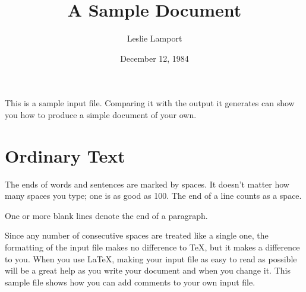 %
 
 
\title{A Sample Document}  %
\author{Leslie Lamport}    %
\date{December 12, 1984}   %
 
 
\maketitle                 %
 
This is a sample input file.  Comparing it with the output it
generates can show you how to produce a simple document of
your own.
 
\section{Ordinary Text}  %
 
The ends  of words and sentences are marked 
  by   spaces. It  doesn't matter how many 
spaces    you type; one is as good as 100.  The
end of   a line counts as a space.
 
One   or more   blank lines denote the  end 
of  a paragraph.  
 
Since any number of consecutive spaces are treated like a single
one, the formatting of the input file makes no difference to
      \TeX,         %
but it makes a difference to you.  
When you use
      \LaTeX,       %
making your input file as easy to read as possible
will be a great help as you write your document and when you
change it.  This sample file shows how you can add comments to
your own input file.
 
